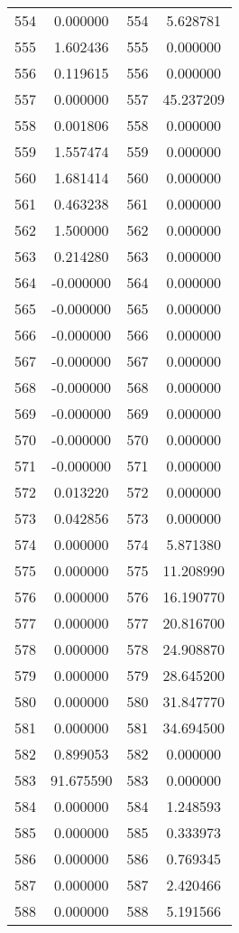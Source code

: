 \documentclass[12pt]{article}
\begin{document}
\begin{longtable}{@{}cccc@{}}
554 & 0.000000 & 554 & 5.628781 \\
555 & 1.602436 & 555 & 0.000000 \\
556 & 0.119615 & 556 & 0.000000 \\
557 & 0.000000 & 557 & 45.237209 \\
558 & 0.001806 & 558 & 0.000000 \\
559 & 1.557474 & 559 & 0.000000 \\
560 & 1.681414 & 560 & 0.000000 \\
561 & 0.463238 & 561 & 0.000000 \\
562 & 1.500000 & 562 & 0.000000 \\
563 & 0.214280 & 563 & 0.000000 \\
564 & -0.000000 & 564 & 0.000000 \\
565 & -0.000000 & 565 & 0.000000 \\
566 & -0.000000 & 566 & 0.000000 \\
567 & -0.000000 & 567 & 0.000000 \\
568 & -0.000000 & 568 & 0.000000 \\
569 & -0.000000 & 569 & 0.000000 \\
570 & -0.000000 & 570 & 0.000000 \\
571 & -0.000000 & 571 & 0.000000 \\
572 & 0.013220 & 572 & 0.000000 \\
573 & 0.042856 & 573 & 0.000000 \\
574 & 0.000000 & 574 & 5.871380 \\
575 & 0.000000 & 575 & 11.208990 \\
576 & 0.000000 & 576 & 16.190770 \\
577 & 0.000000 & 577 & 20.816700 \\
578 & 0.000000 & 578 & 24.908870 \\
579 & 0.000000 & 579 & 28.645200 \\
580 & 0.000000 & 580 & 31.847770 \\
581 & 0.000000 & 581 & 34.694500 \\
582 & 0.899053 & 582 & 0.000000 \\
583 & 91.675590 & 583 & 0.000000 \\
584 & 0.000000 & 584 & 1.248593 \\
585 & 0.000000 & 585 & 0.333973 \\
586 & 0.000000 & 586 & 0.769345 \\
587 & 0.000000 & 587 & 2.420466 \\
588 & 0.000000 & 588 & 5.191566 \\

\end{longtable}
\end{document}
